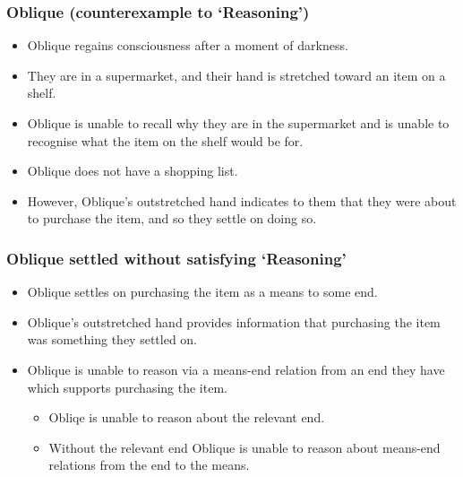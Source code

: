 \documentclass[noamssymb,
]{beamer} %
\begin{document}
\begin{frame}
  \frametitle{Oblique (counterexample to `Reasoning')}

  {\rmfamily
    \begin{itemize}
      \item Oblique regains consciousness after a moment of darkness.%
      \item They are in a supermarket, and their hand is stretched toward an item on a shelf.%
      \item Oblique is unable to recall why they are in the supermarket and is unable to recognise what the item on the shelf would be for.%
      \item Oblique does not have a shopping list.%
      \item However, Oblique's outstretched hand indicates to them that they were about to purchase the item, and so they settle on doing so.
      \end{itemize}
  }
\end{frame}

\begin{frame}
  \frametitle{Oblique settled without satisfying `Reasoning'}

  \begin{itemize}
  \item Oblique settles on purchasing the item as a means to some end.
  \item Oblique's outstretched hand provides information that purchasing the item was something they settled on.
  \item Oblique is unable to reason via a means-end relation from an end they have which supports purchasing the item.
    \begin{itemize}
    \item Obliqe is unable to reason about the relevant end.
    \item Without the relevant end Oblique is unable to reason about means-end relations from the end to the means.
    \end{itemize}
  \end{itemize}

\end{frame}
\end{document}
